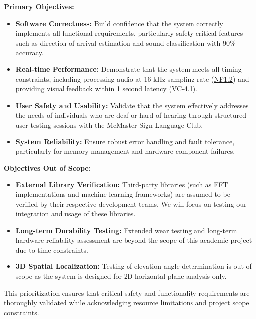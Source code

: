 \documentclass[12pt, titlepage]{article}
\begin{document}
\textbf{Primary Objectives:}
\begin{itemize}
    \item \textbf{Software Correctness:} Build confidence that the system
    correctly implements all functional requirements, particularly
    safety-critical features such as direction of arrival estimation and sound
    classification with 90\% accuracy.
    
    \item \textbf{Real-time Performance:} Demonstrate that the system meets all
    timing constraints, including processing audio at 16 kHz sampling rate
    (\hyperref[SRS-NFR1_2]{NF1.2}) and providing visual feedback within 1 second
    latency (\hyperref[SRS-sec:VC-4.1]{VC-4.1}).
    
    \item \textbf{User Safety and Usability:} Validate that the system
    effectively addresses the needs of individuals who are deaf or hard of
    hearing through structured user testing sessions with the McMaster Sign
    Language Club.
    
    \item \textbf{System Reliability:} Ensure robust error handling and fault
    tolerance, particularly for memory management and hardware component
    failures.
\end{itemize}

\textbf{Objectives Out of Scope:}
\begin{itemize}
    \item \textbf{External Library Verification:} Third-party libraries (such as
    FFT implementations and machine learning frameworks) are assumed to be
    verified by their respective development teams. We will focus on testing our
    integration and usage of these libraries.
    
    \item \textbf{Long-term Durability Testing:} Extended wear testing and
    long-term hardware reliability assessment are beyond the scope of this
    academic project due to time constraints.
        
    \item \textbf{3D Spatial Localization:} Testing of elevation angle
    determination is out of scope as the system is designed for 2D horizontal
    plane analysis only.
\end{itemize}

This prioritization ensures that critical safety and functionality requirements
are thoroughly validated while acknowledging resource limitations and project
scope constraints.
\end{document}
